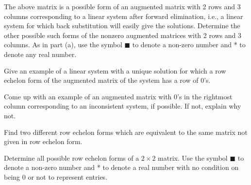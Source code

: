 \item  The above matrix is a possible form of an augmented matrix with 2 rows and 3 columns corresponding to a linear system after forward elimination, i.e., a linear system for which back substitution will easily give the solutions. Determine the other possible such forms of the nonzero augmented matrices with 2 rows and 3 columns. As in part (a), use the symbol $\blacksquare$ to denote a non-zero number and * to denote any real number.


\ea


\item Give an example of a linear system with a unique solution for which a row echelon form of the augmented matrix of the system has a row of 0's.

\item Come up with an example of an augmented matrix with 0's in the rightmost column corresponding to an inconsistent system, if possible. If not, explain why not.

\item Find two different row echelon forms which are equivalent to the same matrix not given in row echelon form.


\item Determine all possible row echelon forms of a $2\times 2$ matrix. Use the symbol $\blacksquare$ to denote a non-zero number and * to denote a real number with no condition on being 0 or not to represent entries.

